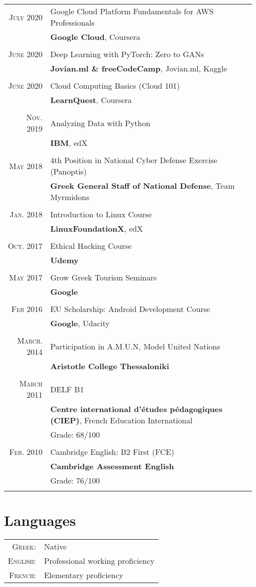\documentclass[a4paper,10pt]{article}
\begin{document}
\begin{tabular}{rl}
    \textsc{July} 2020 & Google Cloud Platform Fundamentals for AWS Professionals \\& \textbf{Google Cloud}, Coursera \\ \\ 
    \textsc{June} 2020 & Deep Learning with PyTorch: Zero to GANs \\& \textbf{Jovian.ml \& freeCodeCamp}, Jovian.ml, Kaggle \\ \\
    \textsc{June} 2020 & Cloud Computing Basics (Cloud 101) \\& \textbf{LearnQuest}, Coursera \\ \\
    \textsc{Nov.} 2019 & Analyzing Data with Python \\& \textbf{IBM}, edX \\ \\
    \textsc{May} 2018 & 4th Position in National Cyber Defense Exercise (Panoptis)  \\& \textbf{Greek General Staff of National Defense}, Team Myrmidons \\ \\
    \textsc{Jan.} 2018 & Introduction to Linux Course\\& \textbf{LinuxFoundationX}, edX \\ \\
    \textsc{Oct.} 2017 & Ethical Hacking Course \\& \textbf{Udemy} \\ \\
    \textsc{May} 2017 & Grow Greek Tourism Seminars \\& \textbf{Google} \\ \\ 
    \textsc{Feb} 2016 & EU Scholarship: Android Development Course \\& \textbf{Google}, Udacity \\ \\
    \textsc{March.} 2014 & Participation in A.M.U.N, Model United Nations \\& \textbf{Aristotle College Thessaloniki} \\ \\
    \textsc{March} 2011 & DELF B1 \\& \textbf{Centre international d'études pédagogiques (CIEP)}, French Education International \\& Grade: 68/100 \\  \\ 
    \textsc{Feb.} 2010 & Cambridge English: B2 First (FCE) \\& \textbf{Cambridge Assessment English} \\& Grade: 76/100 \\ \\ 

\end{tabular}

\section{Languages}
\begin{tabular}{rl}
 \textsc{Greek:}&Native\\
\textsc{English:}&Professional working proficiency\\
\textsc{French:}&Elementary proficiency\\
\end{tabular}
\end{document}
